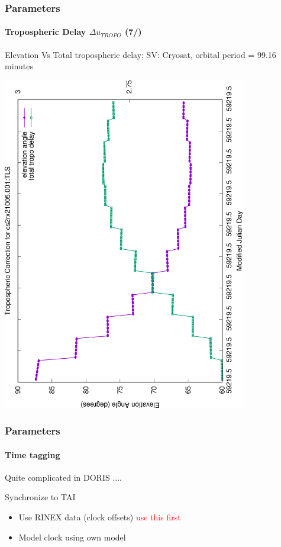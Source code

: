 \documentclass{beamer}
\begin{document}
\begin{frame}\frametitle{Parameters}\framesubtitle{Tropospheric Delay \(\Delta u_{TROPO}\) (7/)}
  Elevation Vs Total tropospheric delay; SV: Cryosat, orbital period = 99.16 minutes
  \begin{center}
  \includegraphics[angle=-90, width=0.8\textwidth]{cs2rx21005.001-tropo-correction}
  \end{center}
\end{frame}

\begin{frame}\frametitle{Parameters}\framesubtitle{Time tagging}
    Quite complicated in DORIS ....
    \vspace{.3cm}

    Synchronize to TAI\\
    \vspace{.3cm}

  \begin{itemize}
      \item Use RINEX data (clock offsets) \textcolor{red}{use this first}
      \item Model clock using own model
  \end{itemize}
    \vspace{.3cm}

\end{frame}
\end{document}
